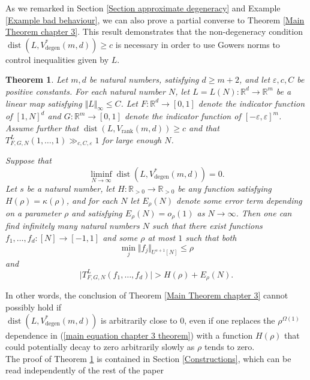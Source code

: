 \documentclass[12pt,a4paper,twoside,reqno]{amsart}
\newtheorem{Theorem}{Theorem}
\newcommand{\degen}{\operatorname{degen}}
\newcommand{\rank}{\operatorname{rank}}
\newcommand{\dist}{\operatorname{dist}}
\numberwithin{equation}{section}
\begin{document}
As we remarked in Section \ref{Section approximate degeneracy} and Example \ref{Example bad behaviour}, we can also prove a partial converse to Theorem \ref{Main Theorem chapter 3}. This result demonstrates that the non-degeneracy condition $\dist(L,V_{\degen}^*(m,d)) \geqslant c$ is necessary in order to use Gowers norms to control inequalities given by $L$.  

\begin{Theorem}
\label{Converse to main theorem}
Let $m,d$ be natural numbers, satisfying $d\geqslant m+2$, and let $\varepsilon, c, C$ be positive constants. For each natural number $N$, let $L = L(N):\mathbb{R}^{d}\longrightarrow \mathbb{R}^m$ be a linear map satisfying $\Vert L\Vert_\infty\leqslant C$. Let $F:\mathbb{R}^d\longrightarrow [0,1]$ denote the indicator function of $[1,N]^d$ and $G:\mathbb{R}^m\longrightarrow [0,1]$ denote the indicator function of $[-\varepsilon,\varepsilon]^m$. Assume further that $\operatorname{dist}(L,V_{\rank}(m,d))\geqslant c$ and that $T_{F,G,N}^L(1,\dots,1)\gg_{c,C,\varepsilon} 1$ for large enough $N$.

Suppose that $$\liminf\limits_{N\rightarrow\infty}\operatorname{dist}(L,V^*_{\degen}(m,d)) = 0.$$ Let $s$ be a natural number, let $H:\mathbb{R}_{>0}\rightarrow \mathbb{R}_{>0}$ be any function satisfying $H(\rho) = \kappa(\rho)$, and for each $N$ let $E_{\rho}(N)$ denote some error term depending on a parameter $\rho$ and satisfying $E_{\rho}(N) = o_{\rho}(1)$ as $N \rightarrow \infty$. Then one can find infinitely many natural numbers $N$ such that there exist functions $f_1,\dots,f_d:[N]\rightarrow [-1,1]$ and some $\rho$ at most $1$ such that both \[ \min_j\Vert f_j\Vert_{U^{s+1}[N]}\leqslant\rho\] and 
\begin{equation}
\label{conclusion of converse theorem}
\vert T_{F,G,N}^L(f_1,\dots,f_d)\vert > H(\rho)+E_{\rho}(N).
\end{equation} 
\end{Theorem}

\noindent In other words, the conclusion of Theorem \ref{Main Theorem chapter 3} cannot possibly hold if\\ $\operatorname{dist}(L,V^*_{\degen}(m,d))$ is arbitrarily close to $0$, even if one replaces the $\rho^{\Omega(1)}$ dependence in (\ref{main equation chapter 3 theorem}) with a function $H(\rho)$ that could potentially decay to zero arbitrarily slowly as $\rho$ tends to zero. \\

The proof of Theorem \ref{Converse to main theorem} is contained in Section \ref{Constructions}, which can be read independently of the rest of the paper \\
\end{document}
